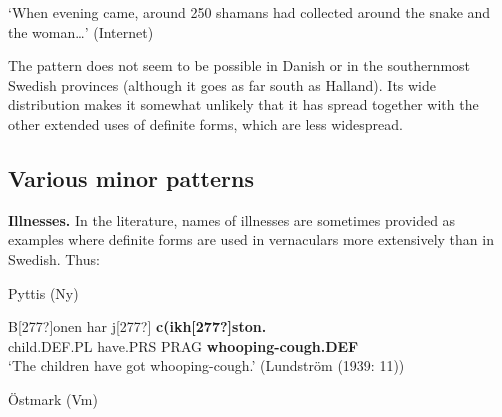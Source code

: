 \glt ‘When evening came, around 250 shamans had collected around the snake and the woman…’ (Internet)

\z

The pattern does not seem to be possible in Danish or in the southernmost Swedish provinces (although it goes as far south as Halland). Its wide distribution makes it somewhat unlikely that it has spread together with the other extended uses of definite forms, which are less widespread. 


\subsection{\rmfamily Various minor patterns}

\textbf{Illnesses.} In the literature, names of illnesses are sometimes provided as examples where definite forms are used in vernaculars more extensively than in Swedish. Thus: 


\item 

Pyttis (Ny) 



 \ea\label{}
\gll B[277?]onen  har  j[277?]  \textbf{c(ikh[277?]ston.}\\


child.DEF.PL  have.PRS  PRAG  \textbf{whooping-cough.DEF}\\

\glt ‘The children have got whooping-cough.’ (Lundström (1939: 11))

\z

\item 

Östmark (Vm)


